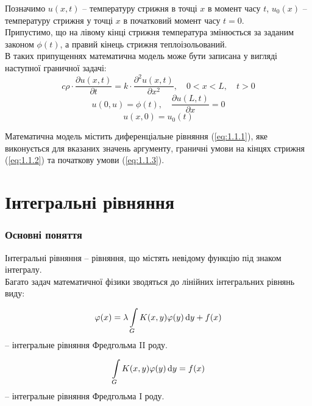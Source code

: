 Позначимо $u(x, t)$ -- температуру стрижня в точці $x$ в момент часу $t$, $u_0(x)$ -- температуру стрижня у точці $x$ в початковий момент часу $t = 0$. \\

Припустимо, що на лівому кінці стрижня температура змінюється за заданим законом $\phi(t)$, а правий кінець стрижня теплоізольований. \\

В таких припущеннях математична модель може бути записана у вигляді наступної граничної задачі:
\begin{equation}
	\label{eq:1.1.1}
	c \rho \cdot \dfrac{\partial u(x, t)}{\partial t} = k \cdot \dfrac{\partial^2 u(x, t)}{\partial x^2}, \quad 0 < x < L, \quad t > 0
\end{equation}
\begin{equation}
	\label{eq:1.1.2}
	u(0, u) = \phi(t), \quad  \dfrac{\partial u(L, t)}{\partial x} = 0
\end{equation}
\begin{equation}
	\label{eq:1.1.3}
	u(x, 0) = u_0(t)
\end{equation}

Математична модель містить диференціальне рівняння (\ref{eq:1.1.1}), яке виконується для вказаних значень аргументу, граничні умови на кінцях стрижня (\ref{eq:1.1.2}) та початкову умови (\ref{eq:1.1.3}).

\section{Інтегральні рівняння}

\subsubsection{Основні поняття}

Інтегральні рівняння -- рівняння, що містять невідому функцію під знаком інтегралу. \\

Багато задач математичної фізики зводяться до лінійних інтегральних рівнянь виду:

\begin{equation}
	\label{eq:2.1}
	\varphi(x) = \lambda \displaystyle\int\limits_G K(x, y) \varphi(y) \mathop{}\!\mathrm{d} y + f(x)
\end{equation}
-- інтегральне рівняння Фредгольма II роду.

\begin{equation}
	\label{eq:2.2}
	\displaystyle\int\limits_G K(x, y) \varphi(y) \mathop{}\!\mathrm{d} y = f(x)
\end{equation}
-- інтегральне рівняння Фредгольма I роду. \\

